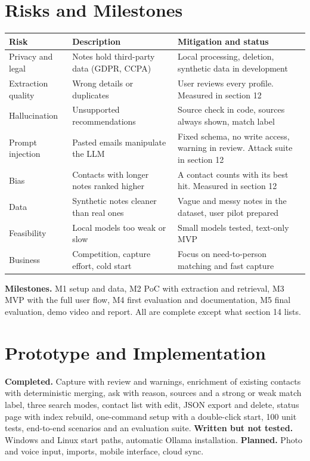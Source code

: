 \documentclass[11pt,letterpaper]{article}
\begin{document}
\section{Risks and Milestones}
\begin{center}\small
\begin{tabularx}{\linewidth}{@{}lYY@{}}
  \toprule
  Risk & Description & Mitigation and status \\
  \midrule
  Privacy and legal & Notes hold third-party data (GDPR, CCPA) & Local processing, deletion, synthetic data in development \\
  Extraction quality & Wrong details or duplicates & User reviews every profile. Measured in section 12 \\
  Hallucination & Unsupported recommendations & Source check in code, sources always shown, match label \\
  Prompt injection & Pasted emails manipulate the LLM & Fixed schema, no write access, warning in review. Attack suite in section 12 \\
  Bias & Contacts with longer notes ranked higher & A contact counts with its best hit. Measured in section 12 \\
  Data & Synthetic notes cleaner than real ones & Vague and messy notes in the dataset, user pilot prepared \\
  Feasibility & Local models too weak or slow & Small models tested, text-only MVP \\
  Business & Competition, capture effort, cold start & Focus on need-to-person matching and fast capture \\
  \bottomrule
\end{tabularx}
\end{center}

\textbf{Milestones.} M1 setup and data, M2 PoC with extraction and retrieval, M3 MVP with the full user flow, M4 first evaluation and documentation, M5 final evaluation, demo video and report. All are complete except what section 14 lists.

\section{Prototype and Implementation}
\textbf{Completed.} Capture with review and warnings, enrichment of existing contacts with deterministic merging, ask with reason, sources and a strong or weak match label, three search modes, contact list with edit, JSON export and delete, status page with index rebuild, one-command setup with a double-click start, 100 unit tests, end-to-end scenarios and an evaluation suite. \textbf{Written but not tested.} Windows and Linux start paths, automatic Ollama installation. \textbf{Planned.} Photo and voice input, imports, mobile interface, cloud sync.
\end{document}
